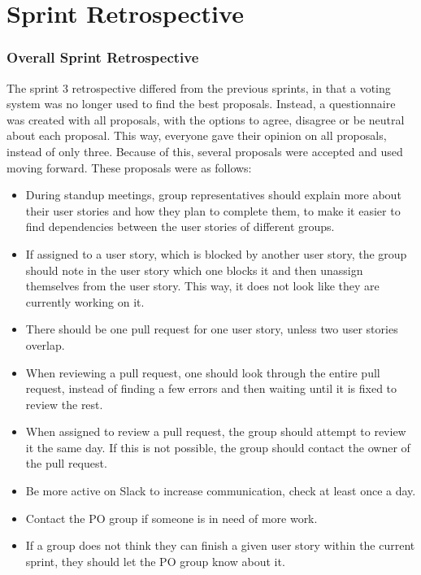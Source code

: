 \section{Sprint Retrospective}

\subsubsection{Overall Sprint Retrospective}
The sprint 3 retrospective differed from the previous sprints, in that a voting system was no longer used to find the best proposals. Instead, a questionnaire was created with all proposals, with the options to agree, disagree or be neutral about each proposal.
This way, everyone gave their opinion on all proposals, instead of only three. Because of this, several proposals were accepted and used moving forward. These proposals were as follows:

\begin{itemize}
    \item During standup meetings, group representatives should explain more about their user stories and how they plan to complete them, to make it easier to find dependencies between the user stories of different groups.
    \item If assigned to a user story, which is blocked by another user story, the group should note in the user story which one blocks it and then unassign themselves from the user story. This way, it does not look like they are currently working on it.
    \item There should be one pull request for one user story, unless two user stories overlap.
    \item When reviewing a pull request, one should look through the entire pull request, instead of finding a few errors and then waiting until it is fixed to review the rest.
    \item When assigned to review a pull request, the group should attempt to review it the same day. If this is not possible, the group should contact the owner of the pull request. 
    \item Be more active on Slack to increase communication, check at least once a day.
    \item Contact the PO group if someone is in need of more work.
    \item If a group does not think they can finish a given user story within the current sprint, they should let the PO group know about it. 
\end{itemize}

